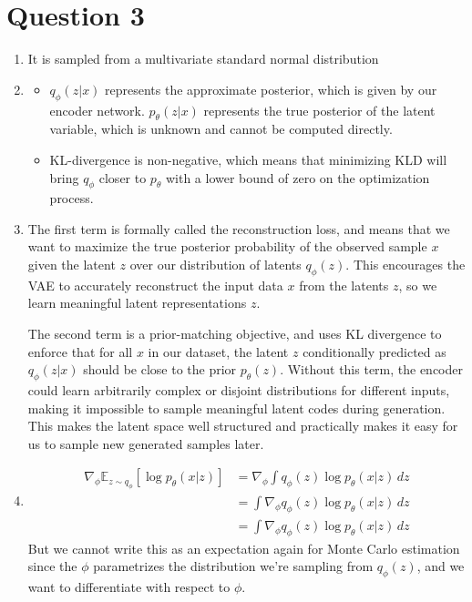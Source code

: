 \documentclass{article}
\begin{document}
\section*{Question 3}
\begin{enumerate}[label=\alph*]
    \item It is sampled from a multivariate standard normal distribution
    \item \begin{itemize}
        \item[(i)] $q_\phi(z | x)$ represents the approximate posterior, which is given by our encoder network. $p_\theta (z | x)$ represents the true posterior of the latent variable, which is unknown and cannot be computed directly.
        \item[(ii)] KL-divergence is non-negative, which means that minimizing KLD will bring $q_\phi$ closer to $p_\theta$ with a lower bound of zero on the optimization process.
    \end{itemize}
    \item The first term is formally called the reconstruction loss, and means that we want to maximize the true posterior probability of the observed sample $x$ given the latent $z$ over our distribution of latents $q_\phi(z)$. This encourages the VAE to accurately reconstruct the input data $x$ from the latents $z$, so we learn meaningful latent representations $z$.
    
    The second term is a prior-matching objective, and uses KL divergence to enforce that for all $x$ in our dataset, the latent $z$ conditionally predicted as $q_\phi(z | x)$ should be close to the prior $p_\theta(z)$. Without this term, the encoder could learn arbitrarily complex or disjoint distributions for different inputs, making it impossible to sample meaningful latent codes during generation. This makes the latent space well structured and practically makes it easy for us to sample new generated samples later.
    \item \begin{align*}
\nabla_\phi \mathbb{E}_{z \sim q_\phi} [\log p_\theta(x | z)] 
&= \nabla_\phi \int q_\phi(z) \log p_\theta(x | z) \, dz \\
&= \int \nabla_\phi q_\phi(z) \log p_\theta(x | z) \, dz \\
&= \int \nabla_\phi q_\phi(z) \log p_\theta(x | z) \, dz
\end{align*}
But we cannot write this as an expectation again for Monte Carlo estimation since the $\phi$ parametrizes the distribution we're sampling from $q_\phi(z)$, and we want to differentiate with respect to $\phi$. 
\end{enumerate}
\end{document}
